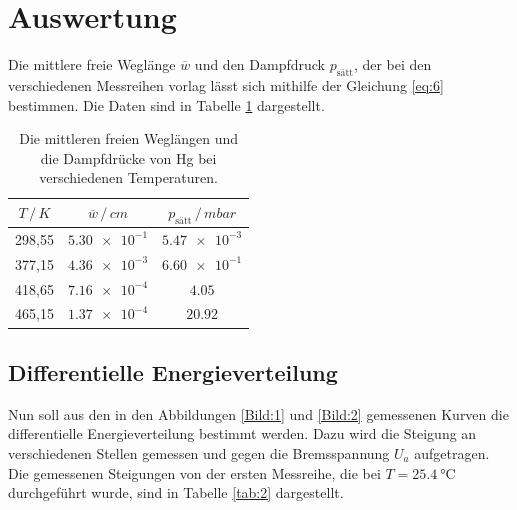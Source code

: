 \section{Auswertung}

Die mittlere freie Weglänge $\overline{w}$ und den Dampfdruck $p_\text{sätt}$, der bei den verschiedenen
Messreihen vorlag lässt sich mithilfe der Gleichung \ref{eq:6} bestimmen. Die Daten
sind in Tabelle \ref{tab:1} dargestellt.

\begin{table}
  \centering
  \caption{Die mittleren freien Weglängen und die Dampfdrücke von Hg bei verschiedenen
  Temperaturen.}
  \label{tab:1}
  \begin{tabular}{c c c}
    \toprule
    $T \, / \, K$ & $\overline{w} \, / \, cm$ & $p_\text{sätt} \, / \, mbar$ \\
    \midrule
    298,55 & $\num{5.30e-1}$ & $\num{5.47e-3}$ \\
    377,15 & $\num{4.36e-3}$ & $\num{6.60e-1}$ \\
    418,65 & $\num{7.16e-4}$ & $\num{4.05}$    \\
    465,15 & $\num{1.37e-4}$ & $\num{20.92}$ \\
    \bottomrule
  \end{tabular}
\end{table}

\subsection{Differentielle Energieverteilung}

Nun soll aus den in den Abbildungen \ref{Bild:1} und \ref{Bild:2} gemessenen Kurven
die differentielle Energieverteilung bestimmt werden. Dazu wird die Steigung
an verschiedenen Stellen gemessen und gegen die Bremsspannung $U_a$ aufgetragen.
Die gemessenen Steigungen von der ersten Messreihe, die bei $T = \SI{25.4}{\celsius}$
durchgeführt wurde, sind in Tabelle \ref{tab:2} dargestellt.

